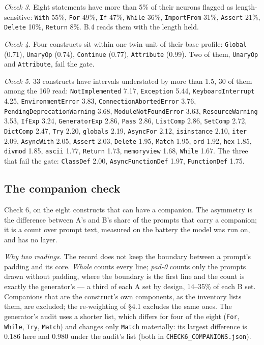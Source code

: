 \documentclass{article}
\begin{document}
\emph{Check 3.} Eight statements have more than 5\% of their neurons flagged as length-sensitive: \texttt{With} 55\%, \texttt{For} 49\%, \texttt{If} 47\%, \texttt{While} 36\%, \texttt{ImportFrom} 31\%, \texttt{Assert} 21\%, \texttt{Delete} 10\%, \texttt{Return} 8\%. B.4 reads them with the length held.

\emph{Check 4.} Four constructs sit within one twin unit of their base profile: \texttt{Global} (0.71), \texttt{UnaryOp} (0.74), \texttt{Continue} (0.77), \texttt{Attribute} (0.99). Two of them, \texttt{UnaryOp} and \texttt{Attribute}, fail the gate.

\emph{Check 5.} 33 constructs have intervals understated by more than 1.5, 30 of them among the 169 read: \texttt{NotImplemented} 7.17, \texttt{Exception} 5.44, \texttt{KeyboardInterrupt} 4.25, \texttt{EnvironmentError} 3.83, \texttt{ConnectionAbortedError} 3.76, \texttt{PendingDeprecationWarning} 3.68, \texttt{ModuleNotFoundError} 3.63, \texttt{ResourceWarning} 3.53, \texttt{IfExp} 3.24, \texttt{GeneratorExp} 2.86, \texttt{Pass} 2.86, \texttt{ListComp} 2.86, \texttt{SetComp} 2.72, \texttt{DictComp} 2.47, \texttt{Try} 2.20, \texttt{globals} 2.19, \texttt{AsyncFor} 2.12, \texttt{isinstance} 2.10, \texttt{iter} 2.09, \texttt{AsyncWith} 2.05, \texttt{Assert} 2.03, \texttt{Delete} 1.95, \texttt{Match} 1.95, \texttt{ord} 1.92, \texttt{hex} 1.85, \texttt{divmod} 1.85, \texttt{ascii} 1.77, \texttt{Return} 1.73, \texttt{memoryview} 1.68, \texttt{While} 1.67. The three that fail the gate: \texttt{ClassDef} 2.00, \texttt{AsyncFunctionDef} 1.97, \texttt{FunctionDef} 1.75.

\subsection{The companion check}

Check 6, on the eight constructs that can have a companion. The asymmetry is the difference between A's and B's share of the prompts that carry a companion; it is a count over prompt text, measured on the battery the model was run on, and has no layer.

\emph{Why two readings.} The record does not keep the boundary between a prompt's padding and its core. \emph{Whole} counts every line; \emph{pad-0} counts only the prompts drawn without padding, where the boundary is the first line and the count is exactly the generator's --- a third of each A set by design, 14--35\% of each B set. Companions that are the construct's own components, as the inventory lists them, are excluded; the re-weighting of \S4.1 excludes the same ones. The generator's audit uses a shorter list, which differs for four of the eight (\texttt{For}, \texttt{While}, \texttt{Try}, \texttt{Match}) and changes only \texttt{Match} materially: its largest difference is 0.186 here and 0.980 under the audit's list (both in \texttt{CHECK6\_COMPANIONS.json}).
\end{document}
